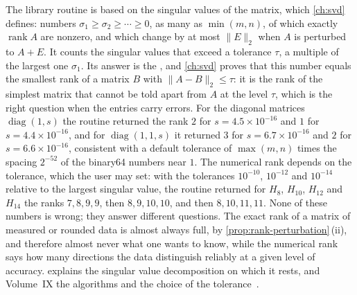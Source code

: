 The library routine is based on the singular values of the matrix, which \cref{ch:svd} defines: numbers $\sigma_1\ge\sigma_2\ge\cdots\ge0$, as many as $\min(m,n)$, of which exactly $\operatorname{rank}A$ are nonzero, and which change by at most $\|E\|_2$ when $A$ is perturbed to $A+E$. It counts the singular values that exceed a tolerance $\tau$, a multiple of the largest one $\sigma_1$. Its answer is the , and \cref{ch:svd} proves that this number equals the smallest rank of a matrix $B$ with $\|A-B\|_2\le\tau$: it is the rank of the simplest matrix that cannot be told apart from $A$ at the level $\tau$, which is the right question when the entries carry errors. For the diagonal matrices $\operatorname{diag}(1,s)$ the routine returned the rank $2$ for $s=4.5\times10^{-16}$ and $1$ for $s=4.4\times10^{-16}$, and for $\operatorname{diag}(1,1,s)$ it returned $3$ for $s=6.7\times10^{-16}$ and $2$ for $s=6.6\times10^{-16}$, consistent with a default tolerance of $\max(m,n)$ times the spacing $2^{-52}$ of the binary64 numbers near $1$. The numerical rank depends on the tolerance, which the user may set: with the tolerances $10^{-10}$, $10^{-12}$ and $10^{-14}$ relative to the largest singular value, the routine returned for $H_8$, $H_{10}$, $H_{12}$ and $H_{14}$ the ranks $7,8,9,9$, then $8,9,10,10$, and then $8,10,11,11$. None of these numbers is wrong; they answer different questions. The exact rank of a matrix of measured or rounded data is almost always full, by \cref{prop:rank-perturbation}\,(ii), and therefore almost never what one wants to know, while the numerical rank says how many directions the data distinguish reliably at a given level of accuracy.  explains the singular value decomposition on which it rests, and Volume~IX the algorithms and the choice of the tolerance~\cite{golub2013}.


